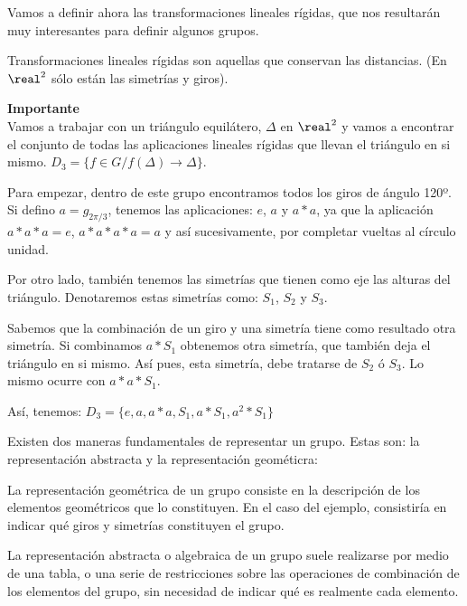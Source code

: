 \documentclass[nochap]{apuntes}
\begin{document}
Vamos a definir ahora las transformaciones lineales rígidas, que nos resultarán muy interesantes para definir algunos grupos.
\begin{defn}
Transformaciones lineales rígidas son aquellas que conservan las distancias. (En $\real^{2}$  sólo están las simetrías y giros).
\end{defn}

\begin{example}\textbf{Importante}\\
  Vamos a trabajar con un triángulo equilátero, $\Delta$  en $\real^{2}$  y vamos a encontrar el conjunto de todas las aplicaciones lineales rígidas
  que llevan el triángulo en si mismo. $D_{3}=\{f\in G / f(\Delta)\longrightarrow\Delta\}$.

  Para empezar, dentro de este grupo encontramos todos los giros de ángulo 120º. \\
  Si defino $a=g_{2\pi/3}$, tenemos las aplicaciones: $e$, $a$  y $a\ast a$, ya que la aplicación $a\ast a\ast a=e$, $a\ast a\ast a\ast a=a$  y así sucesivamente, por completar vueltas al círculo unidad.

  Por otro lado, también tenemos las simetrías que tienen como eje las alturas del triángulo. Denotaremos estas simetrías como: $S_{1}$, $S_{2}$  y $S_{3}$.

  Sabemos que la combinación de un giro y una simetría tiene como resultado otra simetría. Si combinamos $a\ast S_{1}$  obtenemos otra simetría, que también deja el triángulo en si mismo. Así pues, esta simetría, debe tratarse de $S_{2}$  ó $S_{3}$. Lo mismo ocurre con $a\ast a\ast S_{1}$.

  Así, tenemos: $D_{3}=\{e, a, a\ast a, S_{1}, a\ast S_{1}, a^{2}\ast S_{1}\}$
\end{example}

Existen dos maneras fundamentales de representar un grupo. Estas son: la representación abstracta y la representación geométicra:
\begin{defn}
  La representación geométrica de un grupo consiste en la descripción de los elementos geométricos que lo constituyen.
  En el caso del ejemplo, consistiría en indicar qué giros y simetrías constituyen el grupo.
\end{defn}

\begin{defn}
  La representación abstracta o algebraica de un grupo suele realizarse por medio de una tabla, o una serie de restricciones sobre las operaciones
  de combinación de los elementos del grupo, sin necesidad de indicar qué es realmente cada elemento.
\end{defn}
\end{document}
